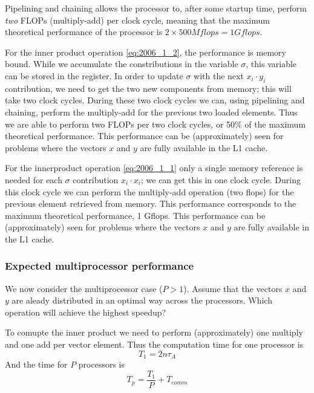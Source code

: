 Pipelining and chaining allows the processor to, after some startup time, perform \emph{two} FLOPs (multiply-add) per clock cycle, meaning that the maximum theoretical performance of the processor is $2\times 500 Mflops=1 Gflops$.

For the inner product operation \eqref{eq:2006_1_2}, the performance is memory bound. While we accumulate the constributions in the variable $\sigma$, this variable can be stored in the register. In order to update $\sigma$ with the next $x_i \cdot y_i$ contribution, we need to get the two new components from memory; this will take two clock cycles. During these two clock cycles we can, using pipelining and chaining, perform the multiply-add for the previous two loaded elements. Thus we are able to perform two FLOPs per two clock cycles, or 50\% of the maximum theoretical performance. This performance can be (approximately) seen for problems where the vectors $x$ and $y$ are fully available in the L1 cache.

For the innerproduct operation \eqref{eq:2006_1_1} only a single memory reference is needed for each $\sigma$ contribution $x_i\cdot x_i$; we can get this in one clock cycle. During this clock cycle we can perform the multiply-add operation (two flops) for the previous element retrieved from memory. This performance corresponds to the maximum theoretical performance, 1 Gflops. This performance can be (approximately) seen for problems where the vectors $x$ and $y$ are fully available in the L1 cache.


\subsubsection{Expected multiprocessor performance} %
\label{ssub:expected_multiprocessor_performance}

\begin{question}
  We now consider the multiprocessor case ($P>1$). Assume that the vectors $x$ and $y$ are aleady distributed in an optimal way across the processors. Which operation will achieve the highest speedup?
\end{question}

To comupte the inner product we need to perform (approximately) one multiply and one add per vector element. Thus the computation time for one processor is
\begin{equation}
  T_1 = 2n\tau_A
\end{equation}
And the time for $P$ processors is
\begin{equation}
  T_p = \frac{T_1}{P} + T_{comm}
\end{equation}

